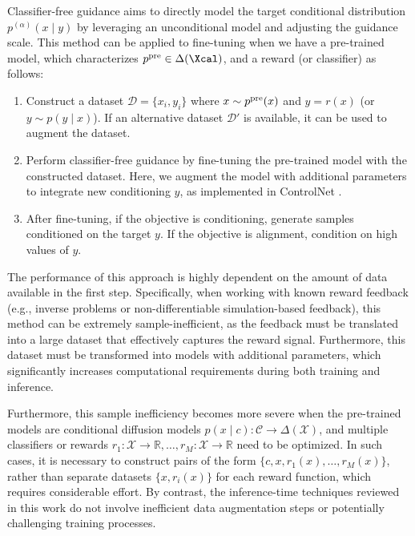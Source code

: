 Classifier-free guidance \citep{ho2022classifier} aims to directly model the target conditional distribution $p^{(\alpha)}(x \mid y)$ by leveraging an unconditional model and adjusting the guidance scale. This method can be applied to fine-tuning when we have a pre-trained model, which characterizes $p^{\pre}\in \Delta(\Xcal)$, and a reward (or classifier) as follows: 

\begin{enumerate} 
\item  Construct a dataset $\mathcal{D} = \{x_i, y_i\}$ where $x \sim p^{\mathrm{pre}}(x)$ and $y = r(x)$ (or $y \sim p(y \mid x)$). If an alternative dataset $\mathcal{D}'$ is available, it can be used to augment the dataset.
\item %
{ Perform classifier-free guidance by fine-tuning the pre-trained model with the constructed dataset. Here, we augment the model with additional parameters to integrate new conditioning $y$, as implemented in ControlNet \citep{zhang2023adding}.} 
\item After fine-tuning, if the objective is conditioning, generate samples conditioned on the target $y$. If the objective is alignment, condition on high values of $y$.
\end{enumerate}

The performance of this approach is highly dependent on the amount of data available in the first step. Specifically, when working with known reward feedback (e.g., inverse problems or non-differentiable simulation-based feedback), this method can be extremely sample-inefficient, as the feedback must be translated into a large dataset that effectively captures the reward signal. Furthermore, this dataset must be transformed into models with additional parameters, which significantly increases computational requirements during both training and inference.


Furthermore, this sample inefficiency becomes more severe when the pre-trained models are conditional diffusion models $p(x \mid c): \mathcal{C} \to \Delta(\mathcal{X})$, and multiple classifiers or rewards $r_1: \mathcal{X} \to \mathbb{R}, \dots, r_M: \mathcal{X} \to \mathbb{R}$ need to be optimized. In such cases, it is necessary to construct pairs of the form $\{c, x, r_1(x), \dots, r_M(x)\}$, rather than separate datasets $\{x, r_i(x)\}$ for each reward function, which requires considerable effort. By contrast, the inference-time techniques reviewed in this work do not involve inefficient data augmentation steps or potentially challenging training processes. 


